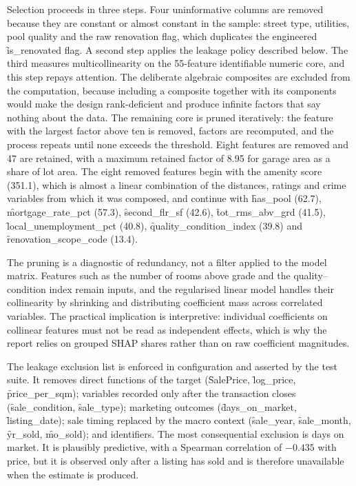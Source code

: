 Selection proceeds in three steps. Four uninformative columns are removed because
they are constant or almost constant in the sample: street type, utilities, pool
quality and the raw renovation flag, which duplicates the engineered
\f{is\_renovated} flag. A second step applies the leakage policy described below.
The third measures multicollinearity on the 55-feature identifiable numeric core, and
this step repays attention. The deliberate algebraic composites are excluded from the
computation, because including a composite together with its components would make
the design rank-deficient and produce infinite factors that say nothing about the
data. The remaining core is pruned iteratively: the feature with the largest factor
above ten is removed, factors are recomputed, and the process repeats until none
exceeds the threshold. Eight features are removed and 47 are retained, with a maximum
retained factor of 8.95 for garage area as a share of lot area. The eight removed features begin with the amenity score
(351.1), which is almost a linear combination of the distances, ratings and crime
variables from which it was composed, and continue with \f{has\_pool} (62.7),
\f{mortgage\_rate\_pct} (57.3), \f{second\_flr\_sf} (42.6), \f{tot\_rms\_abv\_grd}
(41.5), \f{local\_unemployment\_pct} (40.8), \f{quality\_condition\_index} (39.8)
and \f{renovation\_scope\_code} (13.4).



The pruning is a diagnostic of redundancy, not a filter applied to the model matrix.
Features such as the number of rooms above grade and the quality--condition index
remain inputs, and the regularised linear model handles their collinearity by
shrinking and distributing coefficient mass across correlated variables. The
practical implication is interpretive: individual coefficients on collinear features
must not be read as independent effects, which is why the report relies on grouped
SHAP shares rather than on raw coefficient magnitudes.

The leakage exclusion list is enforced in configuration and asserted by the test
suite. It removes direct functions of the target (\f{SalePrice}, \f{log\_price},
\f{price\_per\_sqm}); variables recorded only after the transaction closes
(\f{sale\_condition}, \f{sale\_type}); marketing outcomes (\f{days\_on\_market},
\f{listing\_date}); sale timing replaced by the macro context (\f{sale\_year},
\f{sale\_month}, \f{yr\_sold}, \f{mo\_sold}); and identifiers. The most consequential
exclusion is days on market. It is plausibly predictive, with a Spearman correlation
of $-0.435$ with price, but it is observed only after a listing has sold and is
therefore unavailable when the estimate is produced.
